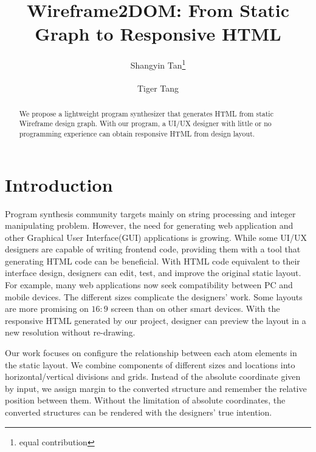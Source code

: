 \documentclass[runningheads]{llncs}
\makeatletter
\newcommand{\printfnsymbol}[1]{%
  \textsuperscript{\@fnsymbol{#1}}%
}
\makeatother
\begin{document}
%
\title{Wireframe2DOM: From Static Graph to Responsive HTML}
%
%
\author{Shangyin Tan\thanks{equal contribution} \and
Tiger Tang\printfnsymbol{1}}
%
%
%
\maketitle              %
%
\begin{abstract}
We propose a lightweight program synthesizer that generates HTML from static Wireframe design graph.
With our program, a UI/UX designer with little or no programming experience can obtain responsive HTML from design layout. 

\end{abstract}
%
%
%
\section{Introduction}
Program synthesis community targets mainly on string processing and integer manipulating problem. However, the need for generating web application and other Graphical User Interface(GUI) applications is growing. While some UI/UX designers are capable of writing frontend code, providing them with a tool that generating HTML code can be beneficial. With HTML code equivalent to their interface design, designers can edit, test, and improve the original static layout. For example, many web applications now seek compatibility between PC and mobile devices. The different sizes complicate the designers' work. Some layouts are more promising on $16:9$ screen than on other smart devices. With the responsive HTML generated by our project, designer can preview the layout in a new resolution without re-drawing.

Our work focuses on configure the relationship between each atom elements in the static layout. We combine components of different sizes and locations into horizontal/vertical divisions and grids.  Instead of the absolute coordinate given by input, we assign margin to the converted structure and remember the relative position between them. Without the limitation of absolute coordinates, the converted structures can be rendered with the designers' true intention.
\end{document}
